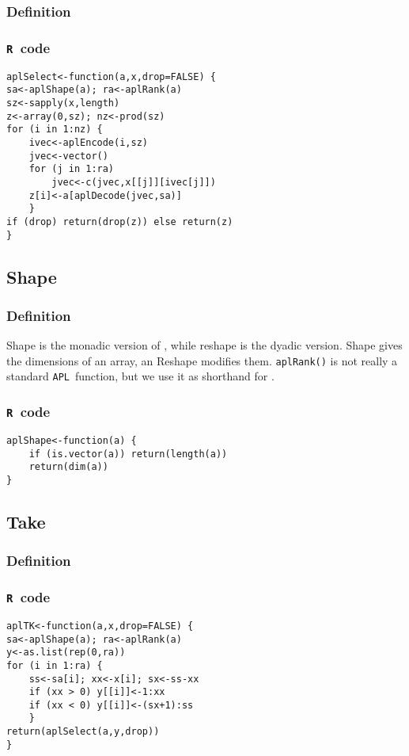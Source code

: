 \documentclass[11pt]{amsart}
\theoremstyle{plain}
\theoremstyle{definition}
\theoremstyle{remark}
\newcommand{\tR}{\texttt{R}}
\newcommand{\tA}{\texttt{APL}}
\newcommand{\tRc}[1]{\lstinline{#1}}
\newcommand{\tAc}[1]{{\apl{#1}}}
\begin{document}
\subsubsection{Definition}
\subsubsection{\tR\ code}\quad
\begin{lstlisting}
aplSelect<-function(a,x,drop=FALSE) {
sa<-aplShape(a); ra<-aplRank(a)
sz<-sapply(x,length)
z<-array(0,sz); nz<-prod(sz)
for (i in 1:nz) {
    ivec<-aplEncode(i,sz)
    jvec<-vector() 
    for (j in 1:ra)
        jvec<-c(jvec,x[[j]][ivec[j]])
    z[i]<-a[aplDecode(jvec,sa)]  
    }
if (drop) return(drop(z)) else return(z)
}
\end{lstlisting}

\subsection{Shape}
\subsubsection{Definition}

Shape is the monadic version of \tAc{\qrho}, while reshape is the dyadic version. Shape gives the dimensions of an array, an Reshape modifies them. \tRc{aplRank()} is not really a standard \tA\ function, but we use it
as shorthand for \tAc{\qrho\qrho A}.

\subsubsection{\tR\ code}\quad
\begin{lstlisting}
aplShape<-function(a) {
    if (is.vector(a)) return(length(a))
    return(dim(a))
}
\end{lstlisting}


\subsection{Take}\quad
\subsubsection{Definition}
\subsubsection{\tR\ code}\quad

\begin{lstlisting}
aplTK<-function(a,x,drop=FALSE) {
sa<-aplShape(a); ra<-aplRank(a)
y<-as.list(rep(0,ra))
for (i in 1:ra) {
    ss<-sa[i]; xx<-x[i]; sx<-ss-xx
    if (xx > 0) y[[i]]<-1:xx
    if (xx < 0) y[[i]]<-(sx+1):ss
    }
return(aplSelect(a,y,drop))
}
\end{lstlisting}
\end{document}
